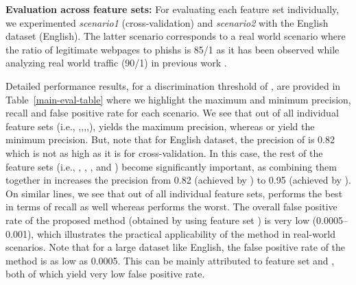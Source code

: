 \documentclass[10pt,conference,compsocconf,letterpaper]{IEEEtran}
\begin{document}
\iffeateval

\textbf{Evaluation across feature sets:} For evaluating each feature set individually, we experimented \textit{scenario1} (cross-validation) and \textit{scenario2} with the English dataset (English). The latter scenario corresponds to a real world scenario where the ratio of legitimate webpages to phishs is 85/1 as it has been observed while analyzing real world traffic (90/1) in previous work \cite{whittaker:2010:large}.

Detailed performance results, for a discrimination threshold of , are provided in Table~\ref{main-eval-table} where we highlight the maximum and minimum precision, recall and false positive rate for each scenario. We see that out of all individual feature sets (i.e., ,,,,),  yields the maximum precision, whereas   or   yield the minimum precision. 
But, note that for English dataset, the precision of  is 0.82 which is not as high as it is for cross-validation. In this case, the rest of the feature sets (i.e., , , ,  and ) become significantly important, as combining them together in  increases the precision from 0.82 (achieved by ) to 0.95 (achieved by ).  
On similar lines, we see that out of all individual feature sets,  performs the best in terms of recall as well whereas  performs the worst.
The overall false positive rate of the proposed method (obtained by using feature set ) is very low (0.0005--0.001), which illustrates the practical applicability of the method in real-world scenarios. Note that for a large dataset like English, the false positive rate of the method is as low as 0.0005. This can be mainly attributed to feature set  and , both of which yield very low false positive rate.
\fi  

		
		

\iffeateval
\end{document}
